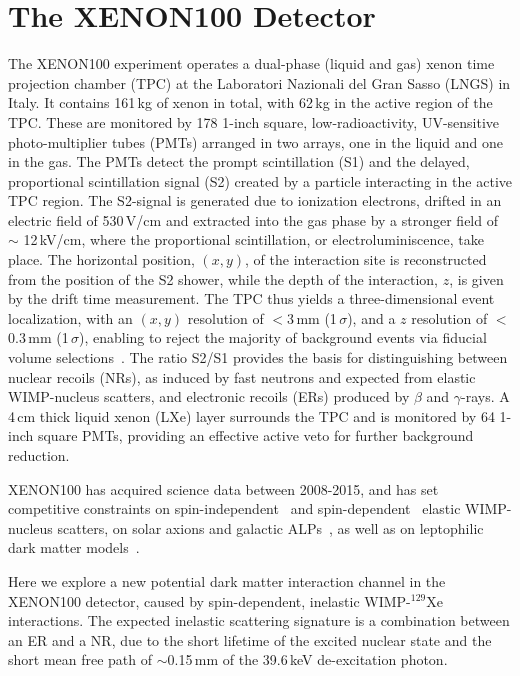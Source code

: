 \section{The XENON100 Detector}
\label{sec:xenon100}

The XENON100 experiment operates a dual-phase (liquid and gas) xenon time projection chamber (TPC) at the Laboratori Nazionali 
del Gran Sasso (LNGS) in Italy. It contains 161\,kg of xenon in total,  with  62\,kg in the active region of the TPC. These 
are monitored by 178 1-inch square, low-radioactivity, UV-sensitive photo-multiplier tubes (PMTs) arranged in two arrays, one in the liquid 
and one in the gas. The PMTs detect the prompt scintillation (S1) and the delayed, proportional scintillation signal (S2) 
created by a particle interacting in the active TPC region. The S2-signal is generated due to ionization electrons, drifted 
in an electric field of 530\,V/cm and extracted into the gas phase by a stronger field of $\sim$ 12\,kV/cm, where the proportional scintillation, or electroluminiscence, 
take place.
The horizontal position, $(x,y)$, of the interaction site is reconstructed from the position of the S2 shower, while the depth of the interaction, $z$, is given by the drift time measurement.
The TPC thus yields a three-dimensional event localization, with an $(x,y)$ resolution of $<$3\,mm (1\,$\sigma$), and a $z$ resolution of  $<$0.3\,mm (1\,$\sigma$), enabling to reject the majority of background events via fiducial volume selections~\cite{Aprile:2011dd}. The ratio S2/S1 provides the basis for distinguishing between nuclear recoils (NRs), as induced by fast neutrons and expected from elastic WIMP-nucleus scatters, and electronic recoils (ERs) produced by $\beta$ and $\gamma$-rays.  A 4\,cm thick liquid xenon (LXe) layer surrounds the TPC and is monitored by 64 1-inch square PMTs, providing an effective active veto for further background reduction.

XENON100 has acquired science data between 2008-2015, and has set competitive constraints on spin-independent~\cite{Aprile:2012nq,Aprile:2016swn} 
and spin-dependent~\cite{Aprile:2013doa,Aprile:2016swn} elastic WIMP-nucleus 
scatters, on solar axions and galactic ALPs~\cite{Aprile:2014eoa}, as well as on leptophilic dark matter models~\cite{Aprile:2015ade,Aprile:2015ibr,Aprile:2017yea}. 

Here we explore a new potential dark matter interaction channel in the XENON100 detector, caused by spin-dependent, inelastic WIMP-$^{129}$Xe interactions. The expected inelastic scattering signature is a combination between an ER and a NR, due to the short lifetime of the excited nuclear state and  the short mean free path of $\sim$0.15\,mm of the 39.6\,keV de-excitation photon. 


